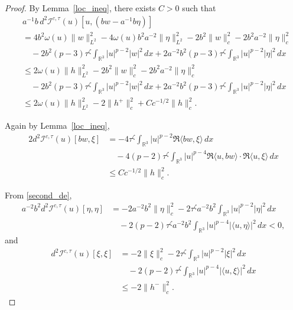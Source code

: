\documentclass{amsart}
\theoremstyle{plain}
\theoremstyle{definition}
\theoremstyle{remark}
\numberwithin{equation}{section} \numberwithin{figure}{section}
\begin{document}
\begin{proof}
  By Lemma~\ref{loc_ineq}, there exists \( C > 0 \) such that
  \begin{equation}\label{prop3_3.3}
  \begin{split}
  &a^{-1} b \, d^2\mathcal{I}^{c,\tau}(u)[u, (b w - a^{-1} b \eta)] \\
  &= 4 b^2 \omega(u) \|w\|_{L^2}^2 - 4 \omega(u) b^2 a^{-2} \|\eta\|_{L^2}^2 - 2 b^2 \|w\|_c^2 - 2 b^2 a^{-2} \|\eta\|_c^2 \\
  &\quad - 2 b^2 (p - 3)\tau^{\zeta} \int_{\mathbb{R}^3} |u|^{p-2} |w|^2 \, dx + 2 a^{-2} b^2 (p - 3)\tau^{\zeta} \int_{\mathbb{R}^3} |u|^{p-2} |\eta|^2 \, dx \\
  &\leq 2 \omega(u) \|h\|_{L^2}^2 - 2 b^2 \|w\|_c^2 - 2 b^2 a^{-2} \|\eta\|_c^2 \\
  &\quad - 2 b^2 (p - 3)\tau^{\zeta} \int_{\mathbb{R}^3} |u|^{p-2} |w|^2 \, dx + 2 a^{-2} b^2 (p - 3)\tau^{\zeta} \int_{\mathbb{R}^3} |u|^{p-2} |\eta|^2 \, dx \\
  &\leq 2 \omega(u) \|h\|_{L^2}^2 - 2 \|h^+\|_c^2 + C c^{-1/2} \|h\|_c^2.
  \end{split}
  \end{equation}
  
  Again by Lemma~\ref{loc_ineq},
  \begin{equation}\label{prop3_3.4}
  \begin{split}
  2 d^2\mathcal{I}^{c,\tau}(u)[b w, \xi]
  &= - 4 \tau^{\zeta} \int_{\mathbb{R}^3} |u|^{p-2} \Re\langle b w, \xi \rangle \, dx \\
  &\quad - 4 (p - 2)\tau^{\zeta} \int_{\mathbb{R}^3} |u|^{p-4} \Re\langle u, b w \rangle \cdot \Re\langle u, \xi \rangle \, dx \\
  &\leq C c^{-1/2} \|h\|_c^2.
  \end{split}
  \end{equation}
  
  From \eqref{second_de},
  \begin{equation}\label{prop3_3.5}
  \begin{split}
  a^{-2} b^2 d^2\mathcal{I}^{c,\tau}(u)[\eta, \eta]
  &= - 2 a^{-2} b^2 \|\eta\|_c^2 - 2 \tau^{\zeta} a^{-2} b^2 \int_{\mathbb{R}^3} |u|^{p-2} |\eta|^2 \, dx \\
  &\quad - 2 (p - 2)\tau^{\zeta} a^{-2} b^2 \int_{\mathbb{R}^3} |u|^{p-4} |\langle u, \eta \rangle|^2 \, dx < 0,
  \end{split}
  \end{equation}
  and
  \begin{equation}\label{prop3_3.6}
  \begin{split}
  d^2\mathcal{I}^{c,\tau}(u)[\xi, \xi]
  &= - 2 \|\xi\|_c^2 - 2 \tau^{\zeta} \int_{\mathbb{R}^3} |u|^{p-2} |\xi|^2 \, dx \\
  &\quad - 2 (p - 2)\tau^{\zeta} \int_{\mathbb{R}^3} |u|^{p-4} |\langle u, \xi \rangle|^2 \, dx \\
  &\leq - 2 \|h^-\|_c^2.
  \end{split}
  \end{equation}
  

\end{proof}
\end{document}

